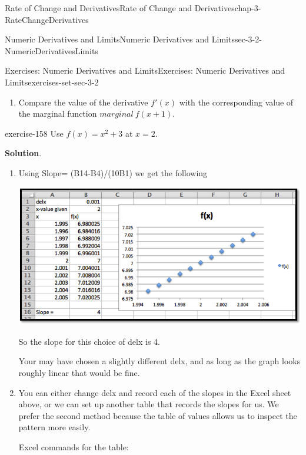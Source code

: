 \documentclass[oneside,10pt,]{book}
\numberwithin{equation}{section}
\begin{document}
\begin{chapterptx}{Rate of Change and Derivatives}{}{Rate of Change and Derivatives}{}{}{chap-3-RateChangeDerivatives}
\begin{sectionptx}{Numeric Derivatives and Limits}{}{Numeric Derivatives and Limits}{}{}{sec-3-2-NumericDerivativesLimits}
\begin{exercises-subsection-numberless}{Exercises: Numeric Derivatives and Limits}{}{Exercises: Numeric Derivatives and Limits}{}{}{exercises-set-sec-3-2}
\begin{enumerate}[label=(\alph*)]
Use the calculator estimate to estimate the slope of the tangent.%
\item\hypertarget{li-320}{}\hypertarget{p-1058}{}%
Compare the value of the derivative \(f'(x)\) with the corresponding value of the marginal function \(marginal\ f(x+1)\).%
\end{enumerate}
\begin{exercisegroup}
\begin{divisionexerciseeg}{1}{}{}{exercise-158}%
\hypertarget{p-1063}{}%
Use \(f(x)=x^2+3\) at \(x=2\).%
\par\smallskip%
\noindent\textbf{Solution}.\hypertarget{solution-78}{}\quad%
\leavevmode%
\begin{enumerate}[label=(\alph*)]
\item\hypertarget{li-321}{}\hypertarget{p-1064}{}%
Using Slope= (B14-B4)\slash{}(10\textasteriskcentered{}B1) we get the following%
\begin{sidebyside}{1}{0.05}{0.05}{0}%
\begin{sbspanel}{0.9}%
\includegraphics[width=1\linewidth]{images/sec3-2-sol1a.png}
\end{sbspanel}%
\end{sidebyside}%
\par
\hypertarget{p-1065}{}%
So the slope for this choice of delx is 4.%
\par
\hypertarget{p-1066}{}%
Your may have chosen a slightly different delx, and as long as the graph looks roughly linear that would be fine.%
\item\hypertarget{li-322}{}\hypertarget{p-1067}{}%
You can either change delx and record each of the slopes in the Excel sheet above, or we can set up another table that records the slopes for us. We prefer the second method because the table of values allows us to inspect the pattern more easily.%
\par
\hypertarget{p-1068}{}%
Excel commands for the table:%

\end{enumerate}
\end{divisionexerciseeg}
\end{exercisegroup}
\end{exercises-subsection-numberless}
\end{sectionptx}
\end{chapterptx}
\end{document}

